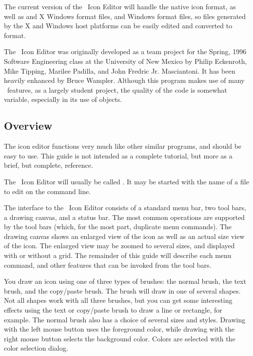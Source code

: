 The current version of the \V\ Icon Editor will handle the native
\V {} icon format, as well as  and 
X Windows format files, and Windows  format files,
so files generated by the X and Windows host platforms can
be easily edited and converted to  format.

The \V\ Icon Editor was originally developed as a team project
for the Spring, 1996 Software Engineering class at the University
of New Mexico by Philip Eckenroth, Mike Tipping, Marilee Padilla,
and John Fredric Jr. Masciantoni.  It has been heavily enhanced
by Bruce Wampler. Although this program makes use of many \V\
features, as a largely student project, the quality of the code
is somewhat variable, especially in its use of objects.

\subsection {Overview}

The icon editor functions very much
like other similar programs, and should be easy to use.
This guide is not intended as a complete tutorial, but
more as a brief, but complete, reference.

The \V\ Icon Editor will usually be called .
It may be started with the name of a file to edit on
the command line.

The interface to the \V\ Icon Editor consists of a standard
menu bar, two tool bars, a drawing canvas, and a status bar.
The most common operations are supported by the tool bars
(which, for the most part, duplicate menu commands).
The drawing canvas shows an enlarged view of the icon as
well as an actual size view of the icon. The enlarged view
may be zoomed to several sizes, and displayed with or without
a grid. The remainder of this guide will describe each
menu command, and other features that can be invoked from
the tool bars.

You draw an icon using one of three types of brushes:
the normal brush, the text brush, and the copy/paste brush.
The brush will draw in one of several shapes. Not all
shapes work with all three brushes, but you can get
some interesting effects using the text or copy/paste
brush to draw a line or rectangle, for example.
The normal brush also has a choice of several sizes and styles.
Drawing with the left mouse button uses the foreground color,
while drawing with the right mouse button selects the background
color. Colors are selected with the color selection dialog.

